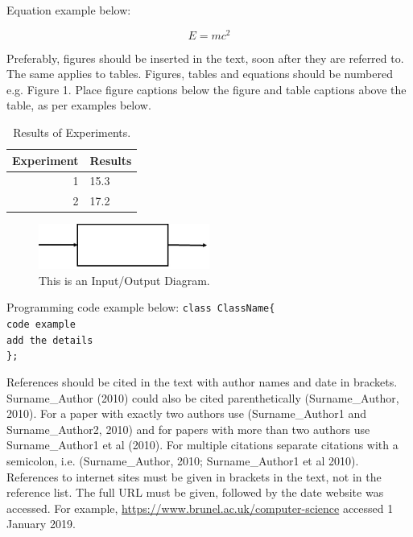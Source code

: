 \documentclass{swpaperproc}
\theoremstyle{sw}
\begin{document}
Equation example below:

\begin{equation} \label{eq:quadratic}
E = mc^2
\end{equation}

Preferably, figures should be inserted in the text, soon after they are referred to. The same
applies to tables. Figures, tables and equations should be numbered e.g. Figure 1. Place figure
captions below the figure and table captions above the table, as per examples below.


\begin{table}[h]
\centering
\caption{Results of Experiments.\label{tab: tableone}}
\begin{tabular}{|r|l|}
\hline
Experiment & Results \\ \hline
1 & 15.3 \\ \hline
2 & 17.2 \\ \hline
\end{tabular}
\end{table}

\begin{figure}
{
\centering
\includegraphics[width=0.50\textwidth]{io}
\caption{This is an Input/Output Diagram.\label{fig: tahi}}
}
\end{figure}

Programming code example below:\newline
\newline
{\tt class ClassName\{}\\
{\tt code example}\\
{\tt add the details}\\
{\tt \};}


References should be cited in the text with author names and date in brackets. 
Surname\_Author (2010) could also be cited parenthetically (Surname\_Author, 2010). For a paper with exactly two authors use (Surname\_Author1 and Surname\_Author2, 2010) and for papers with more than two authors use Surname\_Author1 et al (2010). For multiple citations separate citations with a semicolon, i.e. (Surname\_Author, 2010; Surname\_Author1 et al 2010). References to internet sites must be given in brackets in the text, not in the reference list. The full URL must be given, followed by the date website was accessed. For example, \href{https://www.brunel.ac.uk/computer-science}{https://www.brunel.ac.uk/computer-science} accessed 1 January 2019.
\end{document}
